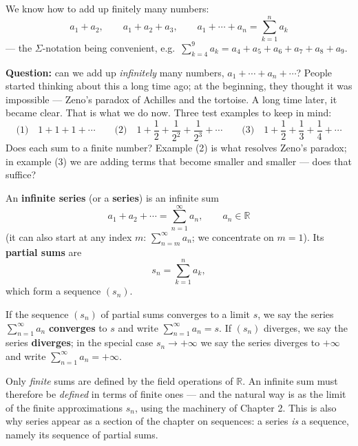 \documentclass[11pt]{report}
\begin{document}
We know how to add up finitely many numbers:
\[
a_1 + a_2, \qquad a_1 + a_2 + a_3, \qquad a_1 + \cdots + a_n = \sum_{k=1}^n a_k
\]
--- the $\Sigma$-notation being convenient, e.g.\ $\sum_{k=4}^{9} a_k = a_4 + a_5 + a_6 + a_7 + a_8 + a_9$.

\textbf{Question:} can we add up \emph{infinitely} many numbers, $a_1 + \cdots + a_n + \cdots$? People started thinking about this a long time ago; at the beginning, they thought it was impossible --- Zeno's paradox of Achilles and the tortoise. A long time later, it became clear. That is what we do now. Three test examples to keep in mind:
\[
\text{(1)} \quad 1 + 1 + 1 + \cdots \qquad
\text{(2)} \quad 1 + \frac12 + \frac1{2^2} + \frac1{2^3} + \cdots \qquad
\text{(3)} \quad 1 + \frac12 + \frac13 + \frac14 + \cdots
\]
Does each sum to a finite number? Example (2) is what resolves Zeno's paradox; in example (3) we are adding terms that become smaller and smaller --- does that suffice?

\begin{defbox}
An \textbf{infinite series} (or a \textbf{series}) is an infinite sum
\[
a_1 + a_2 + \cdots = \sum_{n=1}^{\infty} a_n, \qquad a_n \in \mathbb{R}
\]
(it can also start at any index $m$: $\sum_{n=m}^\infty a_n$; we concentrate on $m = 1$). Its \textbf{partial sums} are
\[
s_n = \sum_{k=1}^{n} a_k,
\]
which form a sequence $(s_n)$.
\end{defbox}

\begin{defbox}
If the sequence $(s_n)$ of partial sums converges to a limit $s$, we say the series $\sum_{n=1}^\infty a_n$ \textbf{converges} to $s$ and write $\sum_{n=1}^\infty a_n = s$. If $(s_n)$ diverges, we say the series \textbf{diverges}; in the special case $s_n \to +\infty$ we say the series diverges to $+\infty$ and write $\sum_{n=1}^\infty a_n = +\infty$.
\end{defbox}

\begin{rembox}
Only \emph{finite} sums are defined by the field operations of $\mathbb{R}$. An infinite sum must therefore be \emph{defined} in terms of finite ones --- and the natural way is as the limit of the finite approximations $s_n$, using the machinery of Chapter 2. This is also why series appear as a section of the chapter on sequences: a series \emph{is} a sequence, namely its sequence of partial sums.
\end{rembox}
\end{document}

